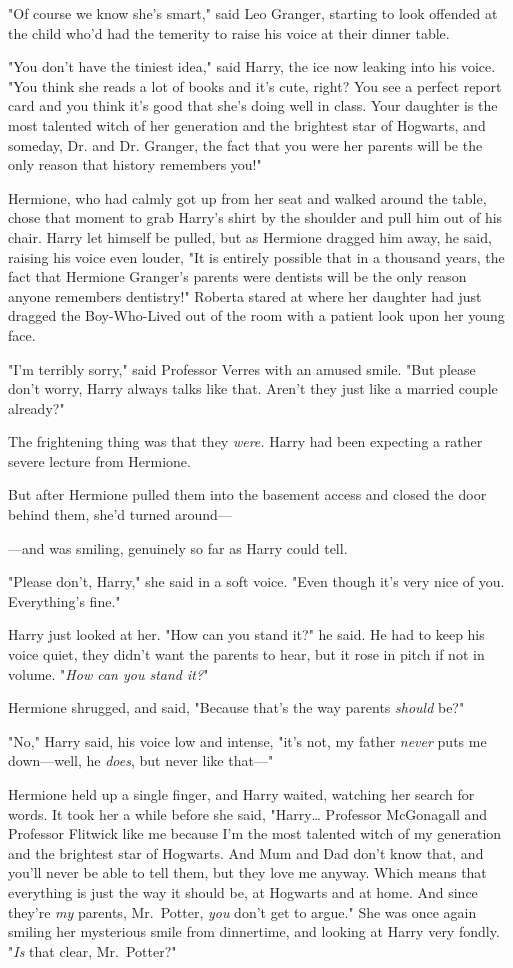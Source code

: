 "Of course we know she's smart," said Leo Granger, starting to look offended at
the child who'd had the temerity to raise his voice at their dinner table.

"You don't have the tiniest idea," said Harry, the ice now leaking into his
voice. "You think she reads a lot of books and it's cute, right? You see a
perfect report card and you think it's good that she's doing well in class.
Your daughter is the most talented witch of her generation and the brightest
star of Hogwarts, and someday, Dr. and Dr. Granger, the fact that you were her
parents will be the only reason that history remembers you!"

Hermione, who had calmly got up from her seat and walked around the table,
chose that moment to grab Harry's shirt by the shoulder and pull him out of his
chair. Harry let himself be pulled, but as Hermione dragged him away, he said,
raising his voice even louder, "It is entirely possible that in a thousand
years, the fact that Hermione Granger's parents were dentists will be the only
reason anyone remembers dentistry!"
\sbreak
Roberta stared at where her daughter had just dragged the Boy-Who-Lived out of
the room with a patient look upon her young face.

"I'm terribly sorry," said Professor Verres with an amused smile. "But please
don't worry, Harry always talks like that. Aren't they just like a married
couple already?"

The frightening thing was that they \emph{were.}
\sbreak
Harry had been expecting a rather severe lecture from Hermione.

But after Hermione pulled them into the basement access and closed the door
behind them, she'd turned around---

---and was smiling, genuinely so far as Harry could tell.

"Please don't, Harry," she said in a soft voice. "Even though it's very nice of
you. Everything's fine."

Harry just looked at her. "How can you stand it?" he said. He had to keep his
voice quiet, they didn't want the parents to hear, but it rose in pitch if not
in volume. "\emph{How can you stand it?}"

Hermione shrugged, and said, "Because that's the way parents \emph{should} be?"

"No," Harry said, his voice low and intense, "it's not, my father \emph{never}
puts me down---well, he \emph{does}, but never like that---"

Hermione held up a single finger, and Harry waited, watching her search for
words. It took her a while before she said, "Harry{\ldots} Professor McGonagall
and Professor Flitwick like me because I'm the most talented witch of my
generation and the brightest star of Hogwarts. And Mum and Dad don't know that,
and you'll never be able to tell them, but they love me anyway. Which means
that everything is just the way it should be, at Hogwarts and at home. And
since they're \emph{my} parents, Mr.~Potter, \emph{you} don't get to argue."
She was once again smiling her mysterious smile from dinnertime, and looking at
Harry very fondly. "\emph{Is} that clear, Mr.~Potter?"

